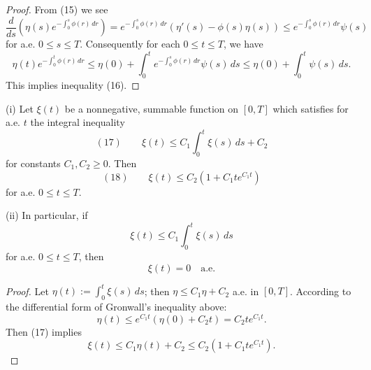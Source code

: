 \begin{proof}
From (15) we see
$$\frac{d}{ds}\left(\eta(s)e^{-\int_0^s \phi(r)\,dr}\right) = e^{-\int_0^s \phi(r)\,dr}(\eta'(s) - \phi(s)\eta(s)) \le e^{-\int_0^s \phi(r)\,dr}\psi(s)$$
for a.e. $0 \le s \le T$. Consequently for each $0 \le t \le T$, we have
$$\eta(t)e^{-\int_0^t \phi(r)\,dr} \le \eta(0) + \int_0^t e^{-\int_0^s \phi(r)\,dr}\psi(s)\,ds \le \eta(0) + \int_0^t \psi(s)\,ds.$$
This implies inequality (16).
\end{proof}

\begin{lemma}
\label{lem:gronwalls-inequality-integral-form}
(i) Let $\xi(t)$ be a nonnegative, summable function on $[0,T]$ which satisfies for a.e. $t$ the integral inequality
$$(17) \qquad \xi(t) \le C_1 \int_0^t \xi(s)\,ds + C_2$$
for constants $C_1, C_2 \ge 0$. Then
$$(18) \qquad \xi(t) \le C_2(1 + C_1 te^{C_1 t})$$
for a.e. $0 \le t \le T$.

(ii) In particular, if
$$\xi(t) \le C_1 \int_0^t \xi(s)\,ds$$
for a.e. $0 \le t \le T$, then
$$\xi(t) = 0 \quad \text{a.e.}$$
\end{lemma}

\begin{proof}
Let $\eta(t) := \int_0^t \xi(s)\,ds$; then $\eta \le C_1 \eta + C_2$ a.e. in $[0,T]$. According to the differential form of Gronwall's inequality above:
$$\eta(t) \le e^{C_1 t}(\eta(0) + C_2 t) = C_2 te^{C_1 t}.$$
Then (17) implies
$$\xi(t) \le C_1 \eta(t) + C_2 \le C_2(1 + C_1 te^{C_1 t}).$$
\end{proof}
